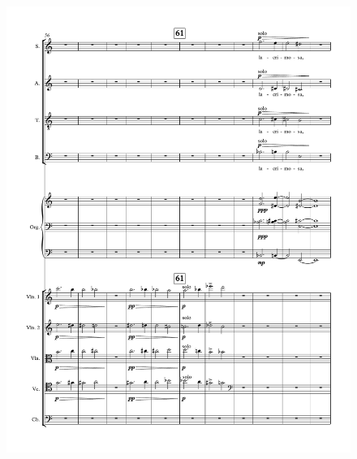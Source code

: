 \begin{figure}[htbp]
    \centering
	\includegraphics[width=6.5in]{figures/Stabat_Mater_12.pdf}
\end{figure}

